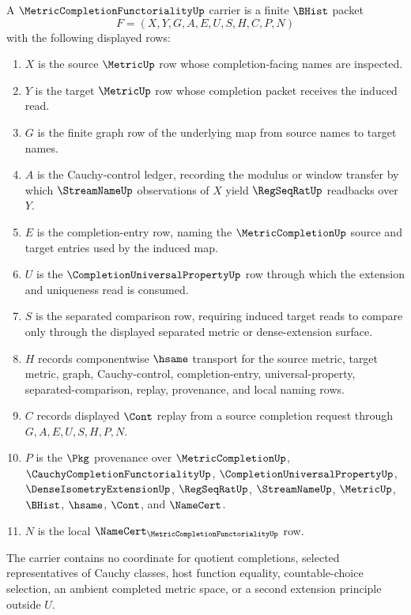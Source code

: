 \begin{definition}
\label{def:metric-completion-functoriality-carrier}
A $\MetricCompletionFunctorialityUp$ carrier is a finite $\BHist$ packet
$$
F=(X,Y,G,A,E,U,S,H,C,P,N)
$$
with the following displayed rows:
\begin{enumerate}
\item $X$ is the source $\MetricUp$ row whose completion-facing names are inspected.
\item $Y$ is the target $\MetricUp$ row whose completion packet receives the induced read.
\item $G$ is the finite graph row of the underlying map from source names to target names.
\item $A$ is the Cauchy-control ledger, recording the modulus or window transfer by which $\StreamNameUp$ observations of $X$ yield $\RegSeqRatUp$ readbacks over $Y$.
\item $E$ is the completion-entry row, naming the $\MetricCompletionUp$ source and target entries used by the induced map.
\item $U$ is the $\CompletionUniversalPropertyUp$ row through which the extension and uniqueness read is consumed.
\item $S$ is the separated comparison row, requiring induced target reads to compare only through the displayed separated metric or dense-extension surface.
\item $H$ records componentwise $\hsame$ transport for the source metric, target metric, graph, Cauchy-control, completion-entry, universal-property, separated-comparison, replay, provenance, and local naming rows.
\item $C$ records displayed $\Cont$ replay from a source completion request through $G,A,E,U,S,H,P,N$.
\item $P$ is the $\Pkg$ provenance over $\MetricCompletionUp$, $\CauchyCompletionFunctorialityUp$, $\CompletionUniversalPropertyUp$, $\DenseIsometryExtensionUp$, $\RegSeqRatUp$, $\StreamNameUp$, $\MetricUp$, $\BHist$, $\hsame$, $\Cont$, and $\NameCert$.
\item $N$ is the local $\NameCert_{\MetricCompletionFunctorialityUp}$ row.
\end{enumerate}
The carrier contains no coordinate for quotient completions, selected representatives of Cauchy classes, host function equality, countable-choice selection, an ambient completed metric space, or a second extension principle outside $U$.
\end{definition}

